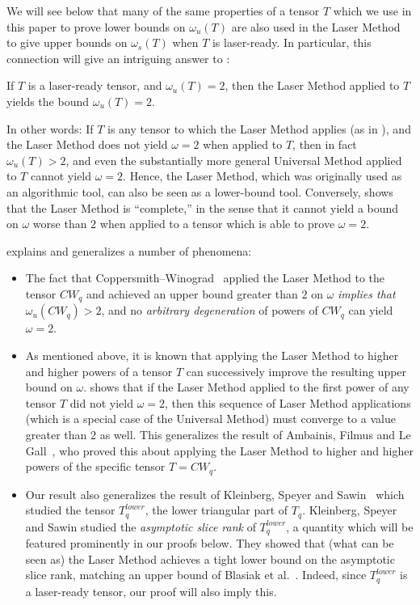 \documentclass{toc}
\begin{document}
We will see below that many of the same properties of a tensor $T$ which we use in this paper to prove lower bounds on $\omega_u(T)$ are also used in the Laser Method to give upper bounds on $\omega_s(T)$ when $T$ is laser-ready. In particular, this connection will give an intriguing answer to :

\begin{theorem} \label{introlaseropt}
If $T$ is a laser-ready tensor, and $\omega_u(T) = 2$, then the Laser Method applied to $T$ yields the bound $\omega_u(T) = 2$.
\end{theorem}

In other words: If $T$ is any tensor to which the Laser Method applies (as in ), and the Laser Method does not yield $\omega=2$ when applied to $T$, then in fact $\omega_u(T)>2$, and even the substantially more general Universal Method applied to $T$ cannot yield $\omega=2$. Hence, the Laser Method, which was originally used as an algorithmic tool, can also be seen as a 
%
lower-bound   %
tool. Conversely,  shows that the Laser Method is ``complete,'' in the sense that it cannot yield a bound on $\omega$ worse than $2$ when applied to a tensor which is able to prove $\omega=2$.

 explains and generalizes a number of phenomena:
\begin{itemize}
    \item The fact that Coppersmith--Winograd~\cite{coppersmith} applied the Laser Method to the tensor $CW_q$ and achieved an upper bound greater than $2$ on $\omega$ \emph{implies that} $\omega_u(CW_q) > 2$, and no \emph{arbitrary degeneration} of powers of $CW_q$ can yield $\omega = 2$.
    
    \item As mentioned above, it is known that applying the Laser Method to higher and higher powers of a tensor $T$ can successively improve the resulting upper bound on $\omega$.  shows that if the Laser Method applied to the first power of any tensor $T$ did not yield $\omega=2$, then this sequence of Laser Method applications (which is a special case of the Universal Method) must converge to a value greater than $2$ as well. This generalizes the result of Ambainis, Filmus and Le Gall~\cite{ambainis}, who proved this about applying the Laser Method to higher and higher powers of the specific tensor $T = CW_q$.
    
    \item Our result also generalizes the result of Kleinberg, Speyer and Sawin~\cite{kleinberg} which studied the tensor $T_q^{lower}$, the lower triangular part of $T_q$. Kleinberg, Speyer and Sawin studied the \emph{asymptotic slice rank} of $T_q^{lower}$, a quantity which will be featured prominently in our proofs below. They showed that (what can be seen as) the Laser Method achieves a tight lower bound on the asymptotic slice rank, matching an upper bound of Blasiak et al.~\cite{blasiak}. Indeed, since $T_q^{lower}$ is a laser-ready tensor, our proof will also imply this.
\end{itemize}
\end{document}
